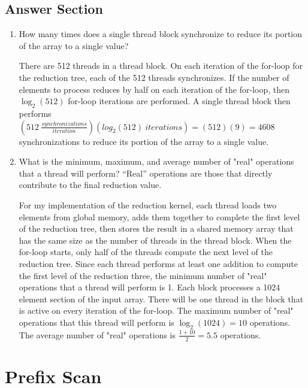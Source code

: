 \documentclass{article}
\begin{document}
\subsection{Answer Section}
\begin{enumerate}
	\item How many times does a single thread block synchronize to reduce its portion of the array to a single value?
	
	There are 512 threads in a thread block. On each iteration of the for-loop for the reduction tree, each of the 512 threads synchronizes. If the number of elements to process reduces by half on each iteration of the for-loop, then $\log_2(512)$ for-loop iterations are performed. A single thread block then  performs $(512 \ \frac{synchronizations}{iteration})(log_2(512) \ iterations)=(512)(9)=4608$ synchronizations to reduce its portion of the array to a single value.
	
	\item What is the minimum, maximum, and average number of "real" operations that a thread will perform? ``Real'' operations are those that directly contribute to the final reduction value.
	
	For my implementation of the reduction kernel, each thread loads two elements from global memory, adds them together to complete the first level of the reduction tree, then stores the result in a shared memory array that has the same size as the number of threads in the thread block. When the for-loop starts, only half of the threads compute the next level of the reduction tree. Since each thread performs at least one addition to compute the first level of the reduction three, the minimum number of "real" operations that a thread will perform is 1. Each block processes a 1024 element section of the input array. There will be one thread in the block that is active on every iteration of the for-loop. The maximum number of "real" operations that this thread will perform is $\log_2(1024)=10$ operations. The average number of "real" operations is $\frac{1+10}{2}=5.5$ operations.
\end{enumerate}
	
\section{Prefix Scan}
\end{document}
